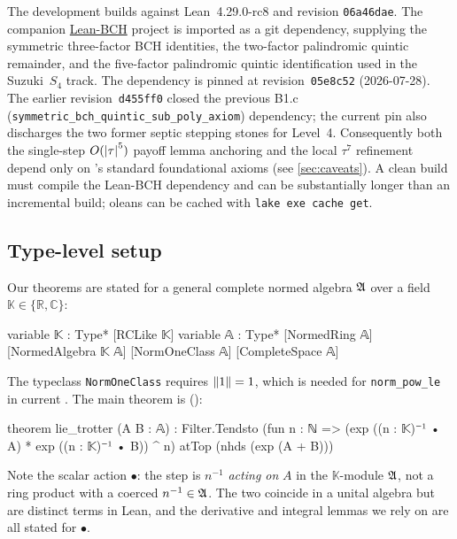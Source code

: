 The development builds against Lean~4.29.0-rc8 and \Mathlib revision
\texttt{06a46dae}.
The companion
\href{https://github.com/Jue-Xu/Lean-BCH}{Lean-BCH} project is imported
as a git dependency, supplying the symmetric three-factor BCH identities,
the two-factor palindromic quintic remainder, and the five-factor
palindromic quintic identification used in the Suzuki~$S_4$ track.
The dependency is pinned at revision~\texttt{05e8c52} (2026-07-28).
The earlier revision~\texttt{d455ff0} closed the previous B1.c
(\texttt{symmetric\_bch\_quintic\_sub\_poly\_axiom}) dependency;
the current pin also discharges the two former septic stepping stones
for Level~4. Consequently both the single-step $O(\left|\tau\right|^5)$
payoff lemma anchoring  and the local
$\tau^7$ refinement depend only on \Lean's standard foundational
axioms (see \cref{sec:caveats}). A clean build must compile the
Lean-BCH dependency and can be substantially longer than an incremental
build; \Mathlib oleans can be cached with \texttt{lake exe cache get}.

\subsection{Type-level setup}
\label{sec:type-setup}

Our theorems are stated for a general complete normed algebra $\mathfrak{A}$ over a
field $\mathbb{K} \in \{\mathbb{R}, \mathbb{C}\}$:

\begin{leancode}
variable {𝕂 : Type*} [RCLike 𝕂]
variable {𝔸 : Type*} [NormedRing 𝔸] [NormedAlgebra 𝕂 𝔸]
  [NormOneClass 𝔸] [CompleteSpace 𝔸]
\end{leancode}

The typeclass \texttt{NormOneClass} requires $\left\|1\right\| = 1$, which is needed
for \texttt{norm\_pow\_le} in current \Mathlib. The main theorem is
():

\begin{leancode}
theorem lie_trotter (A B : 𝔸) :
    Filter.Tendsto
      (fun n : ℕ => (exp ((n : 𝕂)⁻¹ • A) *
                      exp ((n : 𝕂)⁻¹ • B)) ^ n)
      atTop (nhds (exp (A + B)))
\end{leancode}

Note the scalar action $\bullet$: the step is $n^{-1}$ \emph{acting on} $A$
in the $\mathbb{K}$-module $\mathfrak{A}$, not a ring product with a coerced $n^{-1} \in
\mathfrak{A}$. The two coincide in a unital algebra but are distinct terms in Lean, and
the derivative and integral lemmas we rely on are all stated for $\bullet$.

